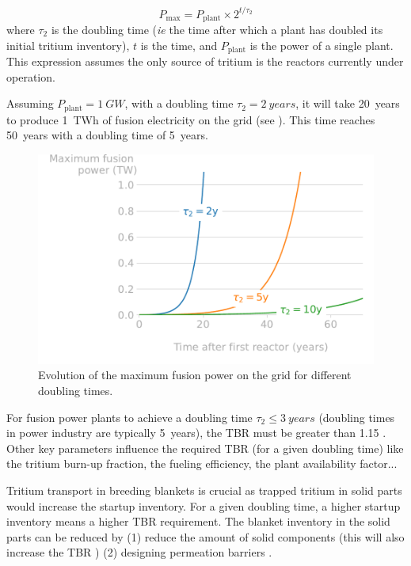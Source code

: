 \begin{equation}
    P_\mathrm{max} = P_\mathrm{plant} \times 2^{t/\tau_2}
\end{equation}
where $\tau_2$ is the doubling time (\textit{ie} the time after which a plant has doubled its initial tritium inventory), $t$ is the time, and $P_\mathrm{plant}$ is the power of a single plant.
This expression assumes the only source of tritium is the reactors currently under operation.

Assuming $P_\mathrm{plant} = \SI{1}{GW}$, with a doubling time $\tau_2 = \SI{2}{years}$, it will take \SI{20}{years} to produce \SI{1}{TWh} of fusion electricity on the grid (see ).
This time reaches \SI{50}{years} with a doubling time of \SI{5}{years}.

\begin{figure}
    \centering
    \includegraphics[width=0.8\linewidth]{Figures/Chapter1/doubling_time.pdf}
    \caption{Evolution of the maximum fusion power on the grid for different doubling times.}
\end{figure}

For fusion power plants to achieve a doubling time $\tau_2 \leq \SI{3}{years}$ (doubling times in power industry are typically \SI{5}{years}), the TBR must be greater than 1.15 .
Other key parameters influence the required TBR (for a given doubling time) like the tritium burn-up fraction, the fueling efficiency, the plant availability factor...

Tritium transport in breeding blankets is crucial as trapped tritium in solid parts would increase the startup inventory.
For a given doubling time, a higher startup inventory means a higher TBR requirement.
The blanket inventory in the solid parts can be reduced by (1) reduce the amount of solid components (this will also increase the TBR \cite{shimwell_multiphysics_2019}) (2) designing permeation barriers .

